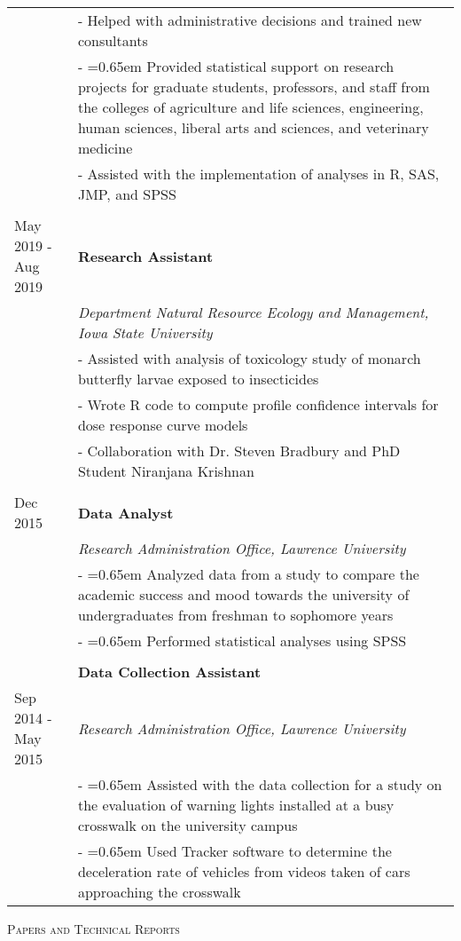 \documentclass[10pt, oneside]{article}
\begin{document}
\begin{longtable}{p{3.5cm}p{13cm}}
& - Helped with administrative decisions and trained new consultants\\
& - \hangindent=0.65em \hangafter=1 Provided statistical support on research projects for graduate students, professors, and staff from the colleges of agriculture and life sciences, engineering, human sciences, liberal arts and sciences, and veterinary medicine\\
& - Assisted with the implementation of analyses in R, SAS, JMP, and SPSS\\
\\
\hfill{May 2019 - Aug 2019} & \textbf{Research Assistant}\\
& \emph{Department Natural Resource Ecology and Management, Iowa State University}\\
& - Assisted with analysis of toxicology study of monarch butterfly larvae exposed to insecticides\\
& - Wrote R code to compute profile confidence intervals for dose response curve models\\
& - Collaboration with Dr. Steven Bradbury and PhD Student Niranjana Krishnan\\
\\
\hfill{Dec 2015} & \textbf{Data Analyst}\\
& \emph{Research Administration Office, Lawrence University} \vspace{0.1cm}\\
& - \hangindent=0.65em \hangafter=1 Analyzed data from a study to compare the academic success and mood towards the university of undergraduates from freshman to sophomore years\\
& - \hangindent=0.65em \hangafter=1 Performed statistical analyses using SPSS\\
\\
& \textbf{Data Collection Assistant}\\
\hfill{Sep 2014 - May 2015} & \emph{Research Administration Office, Lawrence University} \vspace{0.1cm}\\
& - \hangindent=0.65em \hangafter=1 Assisted with the data collection for a study on the evaluation of warning lights installed at a busy crosswalk on the university campus\\
& - \hangindent=0.65em \hangafter=1 Used Tracker software to determine the deceleration rate of vehicles from videos taken of cars approaching the crosswalk
\end{longtable}

\noindent \textsc{Papers and Technical Reports} \hrulefill
\end{document}
